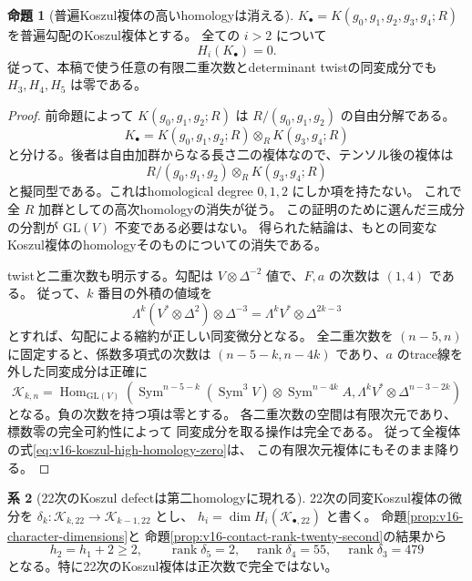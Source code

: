 \documentclass[a4paper,11pt]{ltjsarticle}
\theoremstyle{definition}
\newtheorem{theorem}{命題}[section]
\newtheorem{corollary}[theorem]{系}
\begin{document}
\begin{theorem}[普遍Koszul複体の高いhomologyは消える]
\label{thm:v16-koszul-high-homology-vanishing}
$K_\bullet=K(g_0,g_1,g_2,g_3,g_4;R)$ を普遍勾配のKoszul複体とする。
全ての $i>2$ について
\begin{equation}\label{eq:v16-koszul-high-homology-zero}
 H_i(K_\bullet)=0.
\end{equation}
従って、本稿で使う任意の有限二重次数とdeterminant twistの同変成分でも
$H_3,H_4,H_5$ は零である。
\end{theorem}

\begin{proof}
前命題によって $K(g_0,g_1,g_2;R)$ は
$R/(g_0,g_1,g_2)$ の自由分解である。
\[
 K_\bullet=K(g_0,g_1,g_2;R)\otimes_R K(g_3,g_4;R)
\]
と分ける。後者は自由加群からなる長さ二の複体なので、テンソル後の複体は
\[
 R/(g_0,g_1,g_2)\otimes_R K(g_3,g_4;R)
\]
と擬同型である。これはhomological degree $0,1,2$ にしか項を持たない。
これで全 $R$ 加群としての高次homologyの消失が従う。
この証明のために選んだ三成分の分割が $\mathrm{GL}(V)$ 不変である必要はない。
得られた結論は、もとの同変なKoszul複体のhomologyそのものについての消失である。

twistと二重次数も明示する。勾配は
$V\otimes\Delta^{-2}$ 値で、$F,a$ の次数は $(1,4)$ である。
従って、$k$ 番目の外積の値域を
\[
 \Lambda^k(V^*\otimes\Delta^2)\otimes\Delta^{-3}
   =\Lambda^kV^*\otimes\Delta^{2k-3}
\]
とすれば、勾配による縮約が正しい同変微分となる。
全二重次数を $(n-5,n)$ に固定すると、係数多項式の次数は
$(n-5-k,n-4k)$ であり、$a$ のtrace線を外した同変成分は正確に
\[
 \mathcal K_{k,n}=\operatorname{Hom}_{\mathrm{GL}(V)}
 \left(\operatorname{Sym}^{n-5-k}(\operatorname{Sym}^3V)
 \otimes\operatorname{Sym}^{n-4k}A,
 \Lambda^kV^*\otimes\Delta^{n-3-2k}\right)
\]
となる。負の次数を持つ項は零とする。
各二重次数の空間は有限次元であり、標数零の完全可約性によって
同変成分を取る操作は完全である。
従って全複体の式\eqref{eq:v16-koszul-high-homology-zero}は、
この有限次元複体にもそのまま降りる。
\end{proof}

\begin{corollary}[22次のKoszul defectは第二homologyに現れる]
\label{cor:v16-twentysecond-koszul-defect}
22次の同変Koszul複体の微分を
$\delta_k:\mathcal K_{k,22}\to\mathcal K_{k-1,22}$ とし、
$h_i=\dim H_i(\mathcal K_{\bullet,22})$ と書く。
命題\ref{prop:v16-character-dimensions}と
命題\ref{prop:v16-contact-rank-twenty-second}の結果から
\begin{equation}\label{eq:v16-twentysecond-koszul-defect}
 h_2=h_1+2\ge2,
 \qquad
 \operatorname{rank}\delta_5=2,
 \quad\operatorname{rank}\delta_4=55,
 \quad\operatorname{rank}\delta_3=479
\end{equation}
となる。特に22次のKoszul複体は正次数で完全ではない。
\end{corollary}
\end{document}
